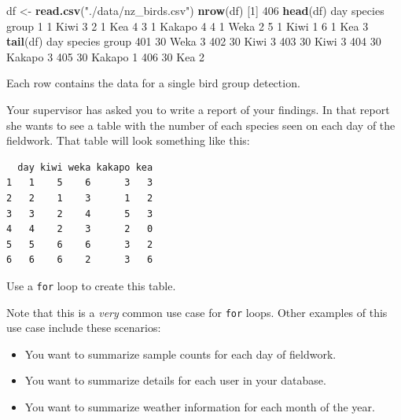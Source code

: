 \documentclass[
]{book}
\newenvironment{Shaded}{\begin{snugshade}}{\end{snugshade}}
\newcommand{\DecValTok}[1]{\textcolor[rgb]{0.00,0.00,0.81}{#1}}
\newcommand{\KeywordTok}[1]{\textcolor[rgb]{0.13,0.29,0.53}{\textbf{#1}}}
\newcommand{\NormalTok}[1]{#1}
\newcommand{\StringTok}[1]{\textcolor[rgb]{0.31,0.60,0.02}{#1}}
\begin{document}
\begin{Shaded}
\begin{Highlighting}[]
\NormalTok{df <-}\StringTok{ }\KeywordTok{read.csv}\NormalTok{(}\StringTok{"./data/nz_birds.csv"}\NormalTok{)}
\KeywordTok{nrow}\NormalTok{(df)}
\NormalTok{[}\DecValTok{1}\NormalTok{] }\DecValTok{406}
\KeywordTok{head}\NormalTok{(df)}
\NormalTok{  day species group}
\DecValTok{1}   \DecValTok{1}\NormalTok{    Kiwi     }\DecValTok{3}
\DecValTok{2}   \DecValTok{1}\NormalTok{     Kea     }\DecValTok{4}
\DecValTok{3}   \DecValTok{1}\NormalTok{  Kakapo     }\DecValTok{4}
\DecValTok{4}   \DecValTok{1}\NormalTok{    Weka     }\DecValTok{2}
\DecValTok{5}   \DecValTok{1}\NormalTok{    Kiwi     }\DecValTok{1}
\DecValTok{6}   \DecValTok{1}\NormalTok{     Kea     }\DecValTok{3}
\KeywordTok{tail}\NormalTok{(df)}
\NormalTok{    day species group}
\DecValTok{401}  \DecValTok{30}\NormalTok{    Weka     }\DecValTok{3}
\DecValTok{402}  \DecValTok{30}\NormalTok{    Kiwi     }\DecValTok{3}
\DecValTok{403}  \DecValTok{30}\NormalTok{    Kiwi     }\DecValTok{3}
\DecValTok{404}  \DecValTok{30}\NormalTok{  Kakapo     }\DecValTok{3}
\DecValTok{405}  \DecValTok{30}\NormalTok{  Kakapo     }\DecValTok{1}
\DecValTok{406}  \DecValTok{30}\NormalTok{     Kea     }\DecValTok{2}
\end{Highlighting}
\end{Shaded}

Each row contains the data for a single bird group detection.

Your supervisor has asked you to write a report of your findings. In that report she wants to see a table with the number of each species seen on each day of the fieldwork. That table will look something like this:

\begin{verbatim}
  day kiwi weka kakapo kea
1   1    5    6      3   3
2   2    1    3      1   2
3   3    2    4      5   3
4   4    2    3      2   0
5   5    6    6      3   2
6   6    6    2      3   6
\end{verbatim}

Use a \texttt{for} loop to create this table.

Note that this is a \emph{very} common use case for \texttt{for} loops. Other examples of this use case include these scenarios:

\begin{itemize}
\item
  You want to summarize sample counts for each day of fieldwork.
\item
  You want to summarize details for each user in your database.
\item
  You want to summarize weather information for each month of the year.
\end{itemize}
\end{document}
